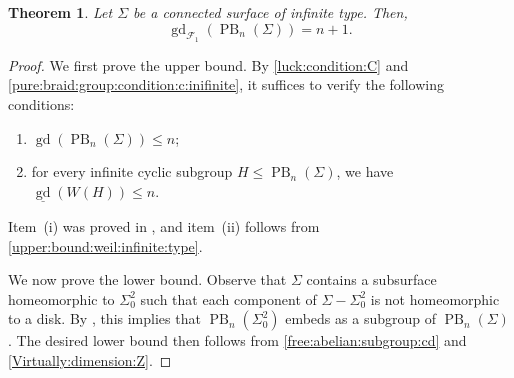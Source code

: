\documentclass[a4paper,12pt,leqno]{amsart}
\newtheorem{theorem}{Theorem}[section]
\theoremstyle{definition}
\newcommand{\calF}{{\mathcal F}}
\DeclareMathOperator{\gd}{gd}
\DeclareMathOperator{\pb}{PB}
\begin{document}
\begin{theorem}
Let \( \Sigma \) be a connected surface of infinite type. Then, 
\[
\gd_{\calF_1}(\pb_n(\Sigma)) = n+ 1.
\]
\end{theorem}
\begin{proof}
 We first prove the upper bound. By \cref{luck:condition:C} and \cref{pure:braid:group:condition:c:inifinite}, it suffices to verify the following conditions:
\begin{enumerate}
    \item[(i)] $\gd(\pb_n(\Sigma))\leq n$;
    \item[(ii)] for every infinite cyclic subgroup \( H \leq \pb_n(\Sigma) \), we have \( \underline{\gd}(W(H)) \leq n \).
\end{enumerate}

 Item~(i) was proved in \cite[Theorem 4.3]{2025arXiv250610706L}, and item~(ii) follows from \cref{upper:bound:weil:infinite:type}.

\medskip

We now prove the lower bound. Observe that \( \Sigma \) contains a subsurface homeomorphic to \( \Sigma_0^2 \) such that each component of \( \Sigma - \Sigma_0^2 \) is not homeomorphic to a disk. By \cite[Proposition 4.2]{2025arXiv250610706L}, this implies that \( \pb_n(\Sigma_0^2) \) embeds as a subgroup of \( \pb_n(\Sigma) \). The desired lower bound then follows from \cref{free:abelian:subgroup:cd} and \cref{Virtually:dimension:Z}.
   
\end{proof}











\end{document}

